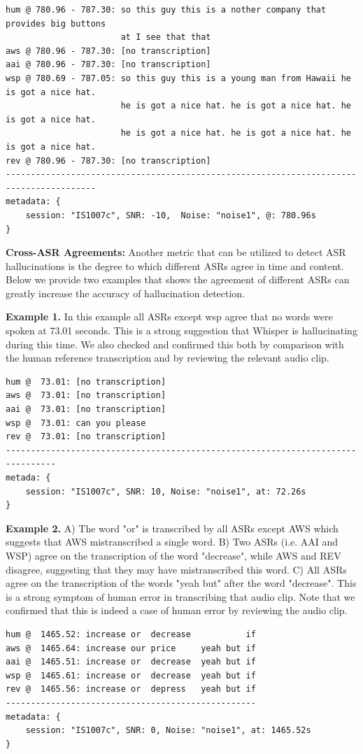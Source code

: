 \documentclass{article}
\begin{document}
\begin{verbatim}
hum @ 780.96 - 787.30: so this guy this is a nother company that provides big buttons 
                       at I see that that
aws @ 780.96 - 787.30: [no transcription]
aai @ 780.96 - 787.30: [no transcription]
wsp @ 780.69 - 787.05: so this guy this is a young man from Hawaii he is got a nice hat. 
                       he is got a nice hat. he is got a nice hat. he is got a nice hat. 
                       he is got a nice hat. he is got a nice hat. he is got a nice hat.
rev @ 780.96 - 787.30: [no transcription]
----------------------------------------------------------------------------------------
metadata: {
    session: "IS1007c", SNR: -10,  Noise: "noise1", @: 780.96s
}
\end{verbatim}

\textbf{Cross-ASR Agreements:} Another metric that can be utilized to detect ASR hallucinations is the degree to which different ASRs agree in time and content. Below we provide two examples that shows the agreement of different ASRs can greatly increase the accuracy of hallucination detection. 

\textbf{Example 1.} In this example all ASRs except wsp agree that no words were spoken at 73.01 seconds. This is a strong suggestion that Whisper is hallucinating during this time. We also checked and confirmed this both by comparison with the human reference transcription and by reviewing the relevant audio clip.
\begin{verbatim}
hum @  73.01: [no transcription]
aws @  73.01: [no transcription]
aai @  73.01: [no transcription]
wsp @  73.01: can you please
rev @  73.01: [no transcription]
--------------------------------------------------------------------------------
metada: {
    session: "IS1007c", SNR: 10, Noise: "noise1", at: 72.26s
}
\end{verbatim}

\textbf{Example 2.} A) The word "or" is transcribed by all ASRs except AWS which suggests that AWS mistranscribed a single word. B) Two ASRs (i.e. AAI and WSP) agree on the transcription of the word "decrease", while AWS and REV disagree, suggesting that they may have mistranscribed this word. C) All ASRs agree on the transcription of the words "yeah but" after the word "decrease". This is a strong symptom of human error in transcribing that audio clip. Note that we confirmed that this is indeed a case of human error by reviewing the audio clip.

\begin{verbatim}
hum @  1465.52: increase or  decrease           if
aws @  1465.64: increase our price     yeah but if 
aai @  1465.51: increase or  decrease  yeah but if
wsp @  1465.61: increase or  decrease  yeah but if
rev @  1465.56: increase or  depress   yeah but if
--------------------------------------------------
metadata: {
    session: "IS1007c", SNR: 0, Noise: "noise1", at: 1465.52s
}
\end{verbatim}
\end{document}
